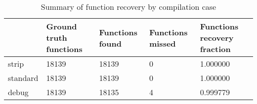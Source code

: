 \begin{table}[t]
\centering
\caption{Summary of function recovery by compilation case}
\label{table:opts-functions-summary}
\begin{tabular}{lp{4.5cm}p{4.5cm}p{4.5cm}p{4.5cm}}
\toprule
{} &  Ground truth functions &  Functions found &  Functions missed &  Functions recovery fraction \\
\midrule
strip    &                   18139 &            18139 &                 0 &                     1.000000 \\
standard &                   18139 &            18139 &                 0 &                     1.000000 \\
debug    &                   18139 &            18135 &                 4 &                     0.999779 \\
\bottomrule
\end{tabular}
\end{table}
